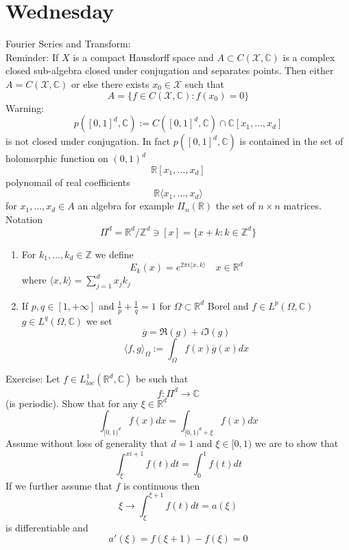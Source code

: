 \documentclass[11pt]{article}
\begin{document}
\section{Wednesday}
Fourier Series and Transform:\\
Reminder: If $X$ is a compact Hausdorff space and  $A \subset C( \mathcal{X}, \mathbb{C})$ is a complex
closed sub-algebra closed under conjugation and separates points.
Then either $A = C( \mathcal{X}, \mathbb{C})$ or else there exists $x_0 \in \mathcal{X}$
such that
\[
    A = \{f \in C( \mathcal{X}, \mathbb{C}) : f(x_0) = 0\}
\]  %
Warning:
\[
    p([0,1]^{d}, \mathbb{C}) :=    C([0,1]^{d}, \mathbb{C}) \cap \mathbb{C}[x_1,\dots,x_d]
\] 
is not closed under conjugation. In fact $p([0,1]^{d}, \mathbb{C})$ is contained in the set of holomorphic
function on $(0,1)^{d}$ \\
\[
    \mathbb{R}[x_1,\dots,x_d]
\] 
polynomail of real coefficients
\[
 \mathbb{R} \langle x_1,\dots,x_d \rangle
\]
for $x_1,\dots,x_d \in A$ an algebra for example $\Pi_n ( \mathbb{R})$ the set of $n \times n$ matrices.
\\
Notation
 \[
     \Pi^{d} = \mathbb{R}^{d} / \mathbb{Z}^{d} \ni [x] = \{x + k : k \in \mathbb{Z}^{d}\}
\] 
\begin{enumerate}
    \item For $k_1,\dots,k_d \in \mathbb{Z}$ we define
        \[
        E_k(x) = e^{2\pi  i \langle x, k \rangle} \quad x \in \mathbb{R}^{d}
        \] 
        where $\langle x , k \rangle = \sum_{j=1}^{d}x_jk_j$
    \item If $p,q \in [1,+\infty]$ and $\frac{1}{p} + \frac{1}{q} = 1$ for $\Omega \subset \mathbb{R}^{d}$ 
        Borel and $f \in L^{p}(\Omega, \mathbb{C})$ $g \in L^{q}(\Omega, \mathbb{C})$
        we set
        \[
        \overline{g} = \Re(g) + i \Im(g)
        \] 
        \[
            \langle f, g \rangle_{\Omega} := \int_{ \Omega}^{}f(x) \overline{g}(x) dx
        \] 
\end{enumerate}
Exercise: Let $f \in L^{1}_{loc}( \mathbb{R}^{d}, \mathbb{C})$ be such that
 \[
f : \Pi^{d} \to \mathbb{C}
\] 
(is periodic). Show that for any  $\xi \in \mathbb{R}^{d}$ 
\[
    \int_{[0,1)^{d}}^{}f(x)dx = \int_{[0,1)^{d} + \xi}^{}f(x)dx
\] 
Assume without loss of generality that $d = 1$ and  $\xi \in [0,1)$
we are to show that
 \[
     \int_{\xi}^{xi + 1}f(t)dt = \int_{0}^{1}f(t)dt
\] 
If we further assume that $f$ is continuous then 
\[
\xi \to \int_{\xi}^{\xi + 1}f(t)dt = a(\xi)
\] 
is differentiable and
\[
a'(\xi) = f(\xi+1) - f(\xi) = 0
\] 
\end{document}
